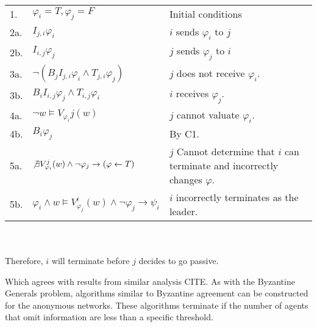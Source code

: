 \begin{table}[h!]
\centering
\small
\begin{tabularx}{\linewidth}{l X X}
1. & $\varphi_i = T, \varphi_j = F$ & Initial conditions \\
2a.& $I_{j,i} \varphi_i$ & $i$ sends $\varphi_i$ to $j$ \\
2b.& $I_{i,j} \varphi_j$ & $j$ sends $\varphi_j$ to $i$ \\
3a.& $\neg (B_j I_{j,i} \varphi_i \wedge T_{j,i} \varphi_j)$ & $j$ does not receive $\varphi_i$. \\
3b.& $B_i I_{i,j} \varphi_j \wedge T_{i,j} \varphi_i$ & $i$ receives $\varphi_j$. \\
4a.& $\neg w \vDash V_{\varphi_i}{j}(w)$ & $j$ cannot valuate $\varphi_i$. \\
4b.& $B_i \varphi_j$ & By C1. \\
5a. & $\not \exists V_{\varphi_i}^j(w) \wedge \neg \varphi_j \rightarrow (\varphi \gets T)$ & $j$ Cannot determine that $i$ can terminate and incorrectly changes $\varphi$. \\
5b. & $\varphi_i \wedge w \vDash V_{\varphi_j}^i(w) \wedge \neg \varphi_j \rightarrow \psi_i$ & $i$ incorrectly terminates as the leader. \\

\end{tabularx} \\~\\
Therefore, $i$ will terminate before $j$ decides to go passive.
\label{tab:anonymityproof}
\end{table}

Which agrees with results from similar analysis CITE.
As with the Byzantine Generals problem, algorithms similar to Byzantine agreement can be constructed for the anonymous networks.
These algorithms terminate if the number of agents that omit information are less than a specific threshold. 
